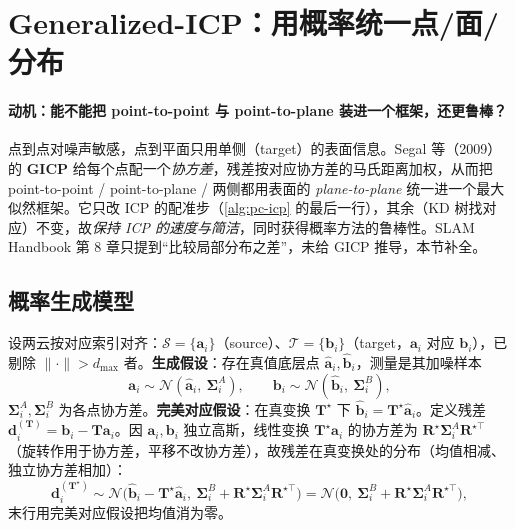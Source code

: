 \section{Generalized-ICP：用概率统一点/面/分布}
\label{sec:pc-gicp}

\paragraph{动机：能不能把 point-to-point 与 point-to-plane 装进一个框架，还更鲁棒？}
点到点对噪声敏感，点到平面只用单侧（target）的表面信息。Segal 等（2009）的 \textbf{GICP}\cite{segal2009gicp} 给每个点配一个\emph{协方差}，残差按对应协方差的马氏距离加权，从而把 point-to-point / point-to-plane / 两侧都用表面的 \emph{plane-to-plane} 统一进一个最大似然框架。它只改 ICP 的配准步（\cref{alg:pc-icp} 的最后一行），其余（KD 树找对应）不变，故\emph{保持 ICP 的速度与简洁}，同时获得概率方法的鲁棒性。SLAM Handbook 第 8 章只提到“比较局部分布之差”，未给 GICP 推导，本节补全。

\subsection{概率生成模型}
\label{sec:pc-gicp-model}

\begin{derivation}
设两云按对应索引对齐：$\mathcal{S}=\{\mathbf{a}_i\}$（source）、$\mathcal{T}=\{\mathbf{b}_i\}$（target，$\mathbf{a}_i$ 对应 $\mathbf{b}_i$），已剔除 $\|\cdot\|>d_{\max}$ 者。\textbf{生成假设}：存在真值底层点 $\hat{\mathbf{a}}_i,\hat{\mathbf{b}}_i$，测量是其加噪样本
\begin{equation}
  \mathbf{a}_i\sim\mathcal{N}(\hat{\mathbf{a}}_i,\ \boldsymbol{\Sigma}_i^{A}),\qquad
  \mathbf{b}_i\sim\mathcal{N}(\hat{\mathbf{b}}_i,\ \boldsymbol{\Sigma}_i^{B}),
  \label{eq:pc-gicp-gen}
\end{equation}
$\boldsymbol{\Sigma}_i^A,\boldsymbol{\Sigma}_i^B$ 为各点协方差。\textbf{完美对应假设}：在真变换 $\mathbf{T}^\star$ 下 $\hat{\mathbf{b}}_i=\mathbf{T}^\star\hat{\mathbf{a}}_i$。定义残差 $\mathbf{d}_i^{(\mathbf{T})}=\mathbf{b}_i-\mathbf{T}\mathbf{a}_i$。因 $\mathbf{a}_i,\mathbf{b}_i$ 独立高斯，线性变换 $\mathbf{T}^\star\mathbf{a}_i$ 的协方差为 $\mathbf{R}^\star\boldsymbol{\Sigma}_i^A\mathbf{R}^{\star\top}$（旋转作用于协方差，平移不改协方差），故残差在真变换处的分布（均值相减、独立协方差相加）：
\begin{equation}
  \mathbf{d}_i^{(\mathbf{T}^\star)}\sim\mathcal{N}\!\Big(\hat{\mathbf{b}}_i-\mathbf{T}^\star\hat{\mathbf{a}}_i,\ \boldsymbol{\Sigma}_i^B+\mathbf{R}^\star\boldsymbol{\Sigma}_i^A\mathbf{R}^{\star\top}\Big)
  =\mathcal{N}\!\Big(\mathbf{0},\ \boldsymbol{\Sigma}_i^B+\mathbf{R}^\star\boldsymbol{\Sigma}_i^A\mathbf{R}^{\star\top}\Big),
  \label{eq:pc-gicp-resdist}
\end{equation}
末行用完美对应假设把均值消为零。
\end{derivation}

